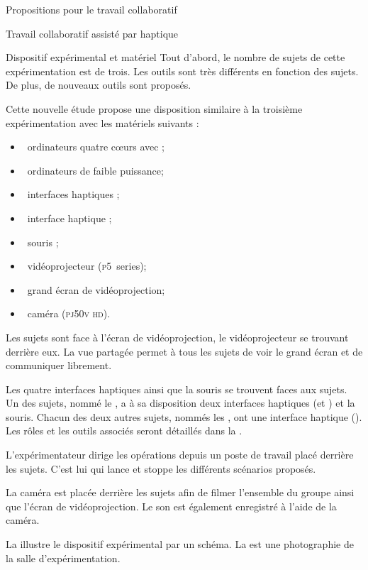 \documentclass[myfrancais]{mythesis}
\begin{document}
\begin{mypart}{Propositions pour le travail collaboratif}
\begin{mychapter}{Travail collaboratif assisté par haptique}
\begin{mysection}{Dispositif expérimental et matériel}
				Tout d'abord, le nombre de sujets de cette expérimentation est de trois.
				Les outils sont très différents en fonction des sujets.
				De plus, de nouveaux outils sont proposés.

				Cette nouvelle étude propose une disposition similaire à la troisième expérimentation  avec les matériels suivants :
				\begin{itemize}
					\item {}~ordinateurs quatre cœurs \myIntelCore avec ;
					\item {}~ordinateurs de faible puissance;
					\item {}~interfaces haptiques \myOmni;
					\item {}~interface haptique \myDesktop;
					\item {}~souris \myUSB;
					\item {}~vidéoprojecteur \myACER (\textsc{p5}~series);
					\item {}~grand écran de vidéoprojection;
					\item {}~caméra \mySony (\textsc{pj50v hd}).
				\end{itemize}

				Les sujets sont face à l'écran de vidéoprojection, le vidéoprojecteur se trouvant derrière eux.
				La vue partagée permet à tous les sujets de voir le grand écran et de communiquer librement.

				Les quatre interfaces haptiques ainsi que la souris se trouvent faces aux sujets.
				Un des sujets, nommé le , a à sa disposition deux interfaces haptiques (\myOmni et \myDesktop) et la souris.
				Chacun des deux autres sujets, nommés les , ont une interface haptique (\myOmni).
				Les rôles et les outils associés seront détaillés dans la .

				L'expérimentateur dirige les opérations depuis un poste de travail placé derrière les sujets.
				C'est lui qui lance et stoppe les différents scénarios proposés.

				La caméra est placée derrière les sujets afin de filmer l'ensemble du groupe ainsi que l'écran de vidéoprojection.
				Le son est également enregistré à l'aide de la caméra.

				La  illustre le dispositif expérimental par un schéma.
				La  est une photographie de la salle d'expérimentation.


\end{mysection}
\end{mychapter}
\end{mypart}
\end{document}
